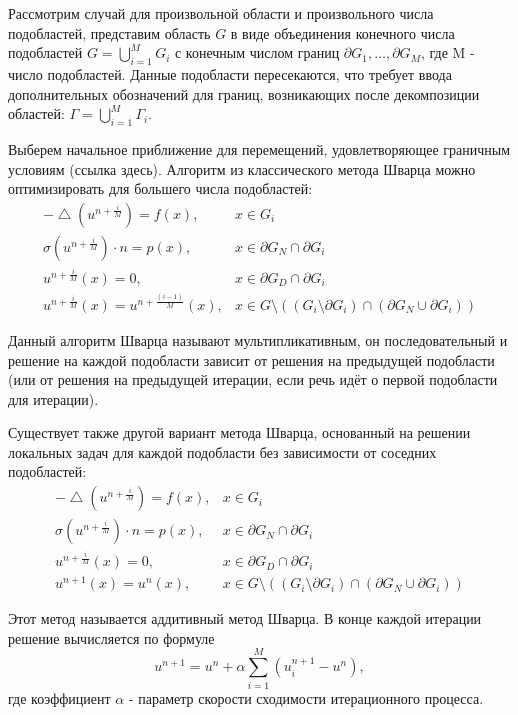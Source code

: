 \documentclass[a4paper]{article}
\begin{document}
Рассмотрим случай для произвольной области и произвольного числа подобластей, представим область $G$ в виде объединения конечного числа подобластей $G = \bigcup_{i=1}^{M} G_i$ с конечным числом границ $\partial G_1, \ldots, \partial G_M$, где M - число подобластей. Данные подобласти пересекаются, что требует ввода дополнительных обозначений для границ, возникающих после декомпозиции областей: $\Gamma = \bigcup_{i=1}^{M} \Gamma_i$. 

Выберем начальное приближение для перемещений, удовлетворяющее граничным условиям (ссылка здесь). Алгоритм из классического метода Шварца можно оптимизировать для большего числа подобластей:
\begin{equation*}
\begin{array}{rl}
-\bigtriangleup \! (u^{n+\frac{i}{M}}) = f(x), & x \in G_i \\
\sigma(u^{n+\frac{i}{M}}) \cdot n = p(x), & x \in \partial G_N \cap \partial G_i \\
u^{n+\frac{i}{M}}(x) = 0, & x \in \partial G_D \cap \partial G_i \\ 
u^{n+\frac{i}{M}}(x) = u^{n+\frac{(i - 1)}{M}}(x), & x \in G \setminus ((G_i \setminus \partial G_i) \cap (\partial G_N \cup \partial G_i))
\end{array}
\end{equation*}

Данный алгоритм Шварца называют мультипликативным, он последовательный и решение на каждой подобласти зависит от решения на предыдущей подобласти (или от решения на предыдущей итерации, если речь идёт о первой подобласти для итерации).

Существует также другой вариант метода Шварца, основанный на решении локальных задач для каждой подобласти без зависимости от соседних подобластей:
\begin{equation*}
\begin{array}{rl}
-\bigtriangleup \! (u^{n+\frac{i}{M}}) = f(x), & x \in G_i \\
\sigma(u^{n+\frac{i}{M}}) \cdot n = p(x), & x \in \partial G_N \cap \partial G_i \\
u^{n+\frac{i}{M}}(x) = 0, & x \in \partial G_D \cap \partial G_i \\ 
u^{n+1}(x) = u^{n}(x), & x \in G \setminus ((G_i \setminus \partial G_i) \cap (\partial G_N \cup \partial G_i))
\end{array}
\end{equation*}

Этот метод называется аддитивный метод Шварца. В конце каждой итерации решение вычисляется по формуле 
\begin{equation*}
u^{n+1} = u^{n} + \alpha \sum_{i=1}^{M} (u_i^{n+1} - u^{n}),
\end{equation*}
где коэффициент $\alpha$ - параметр скорости сходимости итерационного процесса. 
\end{document}
